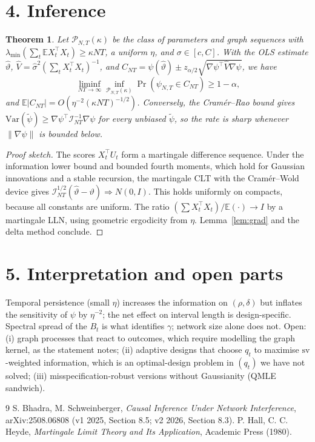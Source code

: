 \documentclass[11pt]{article}
\newtheorem{theorem}{Theorem}
\theoremstyle{definition}
\begin{document}
\section*{4. Inference}
\begin{theorem}\label{thm:ci}
Let $\mathcal P_{N,T}(\kappa)$ be the class of parameters and graph sequences with
$\lambda_{\min}(\sum_t\mathbb E X_t^\top X_t)\ge\kappa NT$, a uniform $\eta$, and $\sigma\in[c,C]$. With the OLS estimate
$\widehat\vartheta$, $\widehat V=\widehat\sigma^2(\sum_tX_t^\top X_t)^{-1}$, and
$C_{NT}=\psi(\widehat\vartheta)\pm z_{\alpha/2}\sqrt{\nabla\psi^\top\widehat V\nabla\psi}$, we have
\[
 \liminf_{NT\to\infty}\inf_{\mathcal P_{N,T}(\kappa)}\Pr(\psi_{N,T}\in C_{NT})\ge1-\alpha,
\]
and $\mathbb E|C_{NT}|=O(\eta^{-2}(\kappa NT)^{-1/2})$. Conversely, the Cram\'er--Rao bound gives
$\mathrm{Var}(\widetilde\psi)\ge\nabla\psi^\top\mathcal I_{NT}^{-1}\nabla\psi$ for every unbiased $\widetilde\psi$, so the
rate is sharp whenever $\|\nabla\psi\|$ is bounded below.
\end{theorem}
\begin{proof}[Proof sketch]
The scores $X_t^\top U_t$ form a martingale difference sequence. Under the information lower bound and bounded fourth
moments, which hold for Gaussian innovations and a stable recursion, the martingale CLT with the Cram\'er--Wold device gives
$\mathcal I_{NT}^{1/2}(\widehat\vartheta-\vartheta)\Rightarrow N(0,I)$. This holds uniformly on compacts, because all
constants are uniform. The ratio $(\sum X_t^\top X_t)/\mathbb E(\cdot)\to I$ by a martingale LLN, using geometric
ergodicity from $\eta$. Lemma~\ref{lem:grad} and the delta method conclude.
\end{proof}

\section*{5. Interpretation and open parts}
Temporal persistence (small $\eta$) increases the information on $(\rho,\delta)$ but inflates the sensitivity of $\psi$ by
$\eta^{-2}$; the net effect on interval length is design-specific. Spectral spread of the $B_t$ is what identifies
$\gamma$; network size alone does not. Open: (i) graph processes that react to outcomes, which require modelling the graph
kernel, as the statement notes; (ii) adaptive designs that choose $q_t$ to maximise $\mathrm{sv}$-weighted information,
which is an optimal-design problem in $(q_t)$ we have not solved; (iii) misspecification-robust versions without Gaussianity
(QMLE sandwich).

\begin{thebibliography}{9}
 S. Bhadra, M. Schweinberger, \emph{Causal Inference Under Network Interference}, arXiv:2508.06808 (v1 2025, Section 8.5; v2 2026, Section 8.3).
 P. Hall, C. C. Heyde, \emph{Martingale Limit Theory and Its Application}, Academic Press (1980).
\end{thebibliography}
\end{document}
